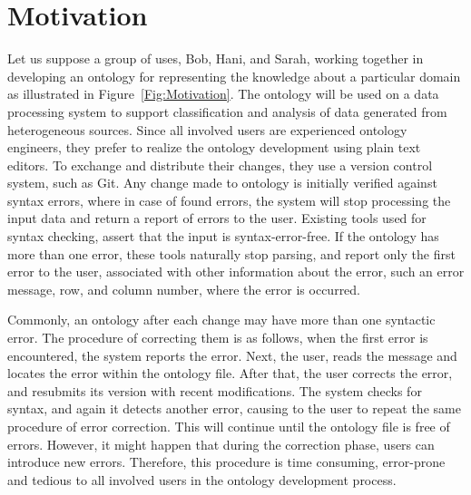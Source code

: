 
\section{Motivation}

Let us suppose a group of uses, Bob, Hani, and Sarah, working together in developing an ontology for representing the knowledge about a particular domain as illustrated in Figure~\ref{Fig:Motivation}.
The ontology will be used on a data processing system to support classification and analysis of data generated from heterogeneous sources. 
Since all involved users are experienced ontology engineers, they prefer to realize the ontology development using plain text editors.
To exchange and distribute their changes, they use a version control system, such as Git.
Any change made to ontology is initially verified against syntax errors, where in case of found errors, the system will stop processing the input data and return a report of errors to the user. 
Existing tools used for syntax checking, assert that the input is syntax-error-free. 
If the ontology has more than one error, these tools naturally stop parsing, and report only the first error to the user, associated with other information about the error, such an error message, row, and column number, where the error is occurred.

Commonly, an ontology after each change may have more than one syntactic error.
The procedure of correcting them is as follows, when the first error is encountered, the system reports the error.
Next, the user, reads the message and locates the error within the ontology file. 
After that, the user corrects the error, and resubmits its version with recent modifications.
The system checks for syntax, and again it detects another error, causing to the user to repeat the same procedure of error correction.
This will continue until the ontology file is free of errors.
However, it might happen that during the correction phase, users can introduce new errors.
Therefore, this procedure is time consuming, error-prone and tedious to all involved users in the ontology development process.

